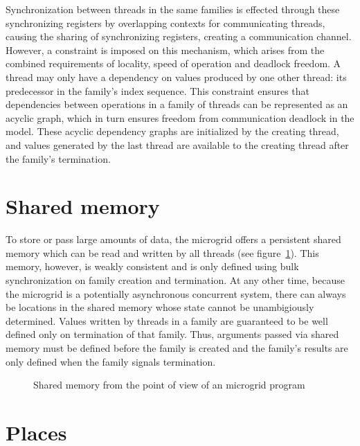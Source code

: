Synchronization between threads in the same families is effected through these synchronizing registers by overlapping contexts for communicating threads, causing the sharing of synchronizing registers, creating a communication channel. However, a constraint is imposed on this mechanism, which arises from the combined requirements of locality, speed of operation and deadlock freedom. A thread may only have a dependency on values produced by one other thread: its predecessor in the family's index sequence. This constraint ensures that dependencies between operations in a family of threads can be represented as an acyclic graph, which in turn ensures freedom from communication deadlock in the model. These acyclic dependency graphs are initialized by the creating thread, and values generated by the last thread are available to the creating thread after the family's termination.

\section{\label{sec:shared-memory}Shared memory}

To store or pass large amounts of data, the microgrid offers a persistent shared memory which can be read and written by all threads (see figure~\ref{fig:shared-memory-view}). This memory, however, is weakly consistent and is only defined using bulk synchronization on family creation and termination. At any other time, because the microgrid is a potentially asynchronous concurrent system, there can always be locations in the shared memory whose state cannot be unambigiously determined. Values written by threads in a family are guaranteed to be well defined only on termination of that family. Thus, arguments passed via shared memory must be defined before the family is created and the family's results are only defined when the family signals termination.

\begin{figure}
 \begin{center}
  
  \caption{Shared memory from the point of view of an microgrid program}
  \label{fig:shared-memory-view}
 \end{center}
\end{figure}

\section{Places}

